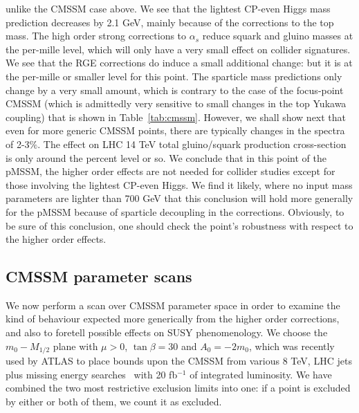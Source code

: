 \documentclass[final,3p,times,pdflatex]{elsarticle}
\begin{document}
unlike the CMSSM case above. 
We see that the lightest CP-even Higgs mass prediction decreases by 2.1 GeV,
mainly because of the  corrections to the top mass. The high order strong
corrections to $\alpha_s$ reduce
squark and gluino masses at the per-mille level, which will only have a very
small effect on collider signatures. 
We see that the RGE corrections do induce a small additional change: but it is
at the per-mille or smaller level for this point.
The sparticle mass predictions only change by a
very small amount, which is contrary to the case of the focus-point CMSSM
(which is 
admittedly very sensitive to small changes in the top Yukawa coupling) that is
shown in Table~\ref{tab:cmssm}. However, we shall show next that even for more
generic CMSSM points, there are typically changes in the spectra of 2-3$\%$.
The effect on LHC 14 TeV total gluino/squark production cross-section is only 
around the percent level or so.
We conclude that in this point of the pMSSM, the higher order effects are not
needed for collider studies except for those involving the lightest CP-even
Higgs. We find it likely, where no input mass parameters are lighter
than 700 GeV that this conclusion will hold more generally for the
pMSSM because of sparticle decoupling in the corrections. 
Obviously, to be sure of this conclusion, one should check the point's
robustness with respect to the higher order effects. 

\subsection{CMSSM parameter scans}

We now perform a scan over CMSSM parameter space in order to examine the kind
of behaviour expected more generically from the higher order corrections, and
also to foretell possible effects on SUSY phenomenology. We choose the
$m_0-M_{1/2}$ plane with $\mu>0$, $\tan \beta=30$ and $A_0=-2m_0$, which was
recently used by ATLAS to place bounds upon the CMSSM from various 8
TeV,  LHC jets plus missing energy
searches~\cite{ATLAS-CONF-2013-047,Aad:2013wta} with 20 fb$^{-1}$ of
integrated luminosity.  
We have combined the two most restrictive exclusion limits into one: if a
point is excluded by either or both of them, we count it as excluded. 
\end{document}
